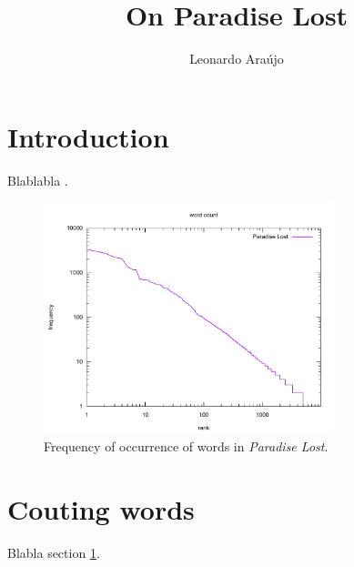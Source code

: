 \documentclass{article}
\title{On Paradise Lost}
\author{Leonardo Araújo}
\begin{document}
\maketitle
\begin{abstract}
\lipsum[4][1-3]
\end{abstract}

\section{Introduction}\label{sec-intro}
\lipsum[1]
Blablabla \cite{milton}.

\begin{figure}[h]
\centering
\includegraphics[width=0.75\textwidth]{imgs/wordcound.pdf}
\caption{Frequency of occurrence of words in \textit{Paradise Lost}.}
\end{figure}

\section{Couting words}\label{sec-count}
\lipsum[2]
Blabla section \ref{sec-intro}.

\lipsum[3][1-3]



\printbibliography
\end{document}
